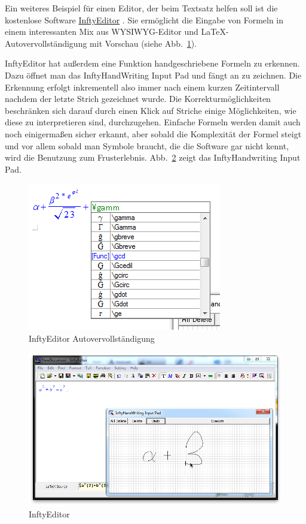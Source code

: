Ein weiteres Beispiel für einen Editor, der beim Textsatz helfen soll ist die kostenlose Software \href{http://www.inftyproject.org}{InftyEditor} \cite{Suzuki:2003p786}. Sie ermöglicht die Eingabe von Formeln in einem interessanten Mix aus \ac{WYSIWYG}-Editor und \LaTeX-Autovervollständigung mit Vorschau (siehe Abb.~\ref{fig:inftyeditor-autocomplete}). 

InftyEditor hat außerdem eine Funktion handgeschriebene Formeln zu erkennen. Dazu öffnet man das InftyHandWriting Input Pad und fängt an zu zeichnen. Die Erkennung erfolgt inkrementell also immer nach einem kurzen Zeitintervall nachdem der letzte Strich gezeichnet wurde. Die Korrekturmöglichkeiten beschränken sich darauf durch einen Klick auf Striche einige Möglichkeiten, wie diese zu interpretieren sind, durchzugehen. Einfache Formeln werden damit auch noch einigermaßen sicher erkannt, aber sobald die Komplexität der Formel steigt und vor allem sobald man Symbole braucht, die die Software gar nicht kennt, wird die Benutzung zum Frusterlebnis. Abb.~\ref{fig:inftyeditor} zeigt das InftyHandwriting Input Pad.

\begin{figure}
  \begin{center}
    \includegraphics[width=.5\textwidth]{figures/inftyeditor-autocomplete.png}
  \end{center}
  \caption{InftyEditor Autovervollständigung}
  \label{fig:inftyeditor-autocomplete}
\end{figure}

\begin{figure}
  \begin{center}
    \includegraphics[width=.8\textwidth]{figures/inftyeditor.png}
  \end{center}
  \caption{InftyEditor}
  \label{fig:inftyeditor}
\end{figure}

